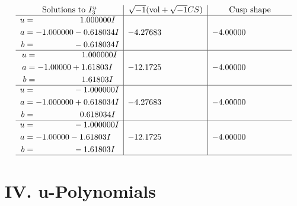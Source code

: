 \documentclass[1p]{elsarticle_modified}
\theoremstyle{definition}
\newcommand{\I}{\sqrt{-1}}
\begin{document}
$$\begin{array}{c|c|c}  
\text{Solutions to }I^u_{3}& \I (\text{vol} + \sqrt{-1}CS) & \text{Cusp shape}\\
 \hline 
\begin{aligned}
u &= \phantom{-0.000000 -}1.000000 I \\
a &= -1.000000 - 0.618034 I \\
b &= \phantom{-0.000000 } -0.618034 I\end{aligned}
 & -4.27683\phantom{ +0.000000I} & -4.00000\phantom{ +0.000000I} \\ \hline\begin{aligned}
u &= \phantom{-0.000000 -}1.000000 I \\
a &= -1.00000 + 1.61803 I \\
b &= \phantom{-0.000000 -}1.61803 I\end{aligned}
 & -12.1725\phantom{ +0.000000I} & -4.00000\phantom{ +0.000000I} \\ \hline\begin{aligned}
u &= \phantom{-0.000000 } -1.000000 I \\
a &= -1.000000 + 0.618034 I \\
b &= \phantom{-0.000000 -}0.618034 I\end{aligned}
 & -4.27683\phantom{ +0.000000I} & -4.00000\phantom{ +0.000000I} \\ \hline\begin{aligned}
u &= \phantom{-0.000000 } -1.000000 I \\
a &= -1.00000 - 1.61803 I \\
b &= \phantom{-0.000000 } -1.61803 I\end{aligned}
 & -12.1725\phantom{ +0.000000I} & -4.00000\phantom{ +0.000000I}\\
 \hline 
 \end{array}$$\newpage
\newpage\renewcommand{\arraystretch}{1}
\centering \section*{ IV. u-Polynomials}
\end{document}

